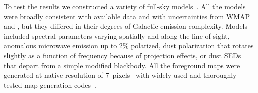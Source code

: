 \documentclass[PICOReport.tex]{subfiles}
\begin{document}



To test the results we constructed a variety of full-sky models~\citep{gnilc_memo}. All the models were broadly consistent with available data and with uncertainties from WMAP and \planck , but they differed in their degrees of Galactic emission complexity. Models included spectral parameters varying spatially and along the line of sight, anomalous microwave emission up to 2\% polarized, dust polarization that rotates slightly as a function of frequency because of projection effects, or dust \ac{SED}s that depart from a simple modified blackbody. All the foreground maps were generated at native resolution of 7\arcmin\ pixels~\citep{gorski/etal:2005} with widely-used and thoroughly-tested map-generation codes~\citep{thorne2018_pysm,delabrouille/etal:2013}. 
\end{document}
